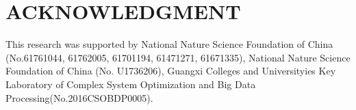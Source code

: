 \documentclass[runningheads,a4paper]{llncs}
\begin{document}
\section{ACKNOWLEDGMENT}
This research was supported by National Nature Science Foundation of China (No.61761044, 61762005, 61701194, 61471271, 61671335), National Nature Science Foundation of China (No. U1736206), Guangxi Colleges and Universityies Key Laboratory of Complex System Optimization and Big Data Processing(No.2016CSOBDP0005).

\label{bib:bibliography}


\end{document}

